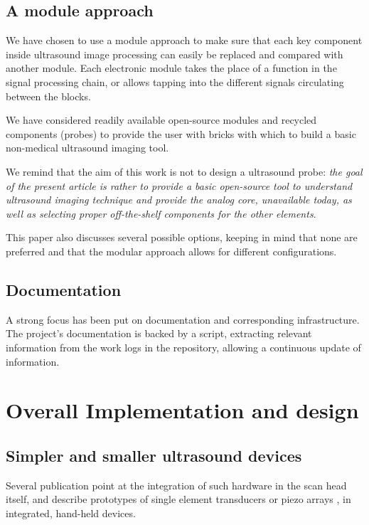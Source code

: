 \documentclass[letterpaper, 10 pt, conference]{ieeeconf} %
\begin{document}
\subsection{A module approach}

We have chosen to use a module approach to make sure that each key component inside ultrasound image processing can easily be replaced and compared with another module. Each electronic module takes the place of a function in the signal processing chain, or allows tapping into the different signals circulating between the blocks.

We have considered readily available open-source modules and recycled components (probes) to provide the user with bricks with which to build a basic non-medical ultrasound imaging tool. 

We remind that the aim of this work is not to design a ultrasound probe: \textit{the goal of the present article is rather to provide a basic open-source tool to understand ultrasound imaging technique and provide the analog core, unavailable today, as well as selecting proper off-the-shelf components for the other elements}.

This paper also discusses several possible options, keeping in mind that none are preferred and that the modular approach allows for different configurations. 

\subsection{Documentation}

A strong focus has been put on documentation and corresponding infrastructure. The project's documentation is backed by a script, extracting relevant information from the work logs in the repository, allowing a continuous update of information.

\section{Overall Implementation and design}

\subsection{Simpler and smaller ultrasound devices}

Several publication point at the integration of such hardware in the scan head itself, and describe prototypes of single element transducers \cite{c4,c5,c9} or piezo arrays \cite{c1,c3,c7}, in integrated, hand-held devices. 
\end{document}
